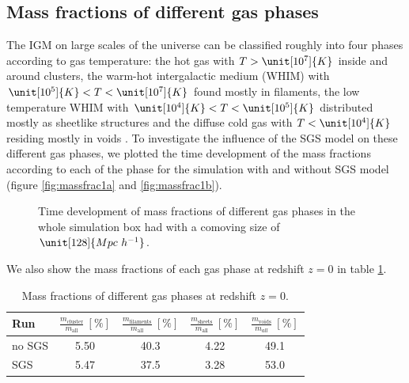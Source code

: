 \subsection{Mass fractions of different gas phases}
The IGM on large scales of the universe can be classified roughly into four
phases according to gas temperature: the hot gas with $T > \unit[10^7]{K}$
inside and around clusters, the warm-hot intergalactic medium (WHIM) with
$\unit[10^5]{K} < T < \unit[10^7]{K}$ found mostly in filaments, the low
temperature WHIM with $\unit[10^4]{K} < T < \unit[10^5]{K}$ distributed mostly
as sheetlike structures and the diffuse cold gas with $T < \unit[10^4]{K}$
residing mostly in voids \citep{Cen1999,Kang2005}. To investigate the influence
of the SGS model on these different gas phases, we plotted the time development
of the mass fractions according to each of the phase for the simulation with
and without SGS model (figure \ref{fig:massfrac1a} and \ref{fig:massfrac1b}).
\begin{figure}[tp]
\centering
{}
\caption{Time development of mass fractions of different gas phases in the
whole simulation box had with a comoving size of
$\unit[128]{Mpc\ h^{-1}}$.}
\end{figure}
We also show the mass fractions of each gas phase at redshift $z=0$ in table
\ref{tab:massfrac1}. 
\begin{table}[htbp]
\begin{center}
\begin{tabular}{lcccc}
\hline
Run & 
$\frac{m_{\text{cluster}}}{m_{\text{all}}}\ [\%]$ &
$\frac{m_{\text{filaments}}}{m_{\text{all}}}\ [\%]$ &
$\frac{m_{\text{sheets}}}{m_{\text{all}}}\ [\%]$ & 
$\frac{m_{\text{voids}}}{m_{all}}\ [\%]$ \vspace*{1mm} \\
\hline
\hline
no SGS & 5.50 & 40.3 & 4.22 & 49.1\\ 
SGS & 5.47 & 37.5 & 3.28 & 53.0 \\
\hline
\end{tabular}
\end{center}
\caption{Mass fractions of different gas phases at redshift $z=0$.}
\label{tab:massfrac1}
\end{table}
